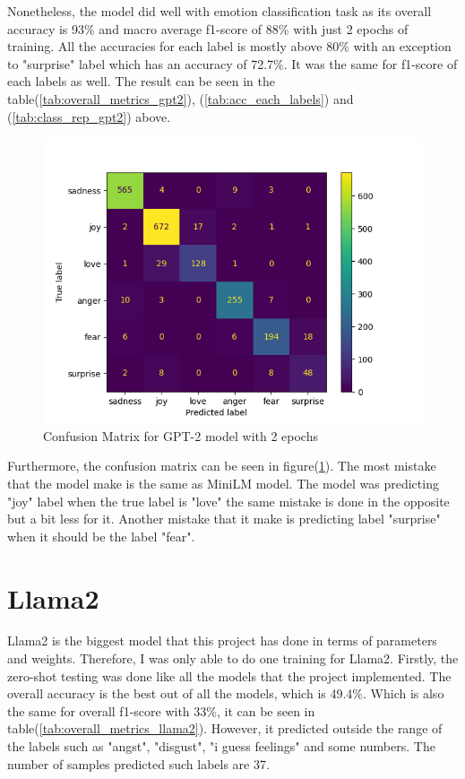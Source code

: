 Nonetheless, the model did well with emotion classification task as its overall accuracy is 93\% and macro average f1-score of 88\% with just 2 epochs of training. All the accuracies for each label is mostly above 80\% with an exception to "surprise" label which has an accuracy of 72.7\%. It was the same for f1-score of each labels as well. The result can be seen in the table(\ref{tab:overall_metrics_gpt2}), (\ref{tab:acc_each_labels}) and (\ref{tab:class_rep_gpt2}) above.

\begin{figure}[h!]
    \centerline{\includegraphics[scale=0.6]{Figures/conf_metrix_gpt2_2_epochs.png}}
    \caption{Confusion Matrix for GPT-2 model with 2 epochs}
    \label{fig:conf_matrix_gpt2}
\end{figure}

Furthermore, the confusion matrix can be seen in figure(\ref{fig:conf_matrix_gpt2}). The most mistake that the model make is the same as MiniLM model. The model was predicting "joy" label when the true label is "love" the same mistake is done in the opposite but a bit less for it. Another mistake that it make is predicting label "surprise" when it should be the label "fear". 

\section{Llama2}

Llama2 is the biggest model that this project has done in terms of parameters and weights. Therefore, I was only able to do one training for Llama2. Firstly, the zero-shot testing was done like all the models that the project implemented. The overall accuracy is the best out of all the models, which is 49.4\%. Which is also the same for overall f1-score with 33\%, it can be seen in table(\ref{tab:overall_metrics_llama2}). However, it predicted outside the range of the labels such as "angst", "disgust", "i guess feelings" and some numbers. The number of samples predicted such labels are 37.

